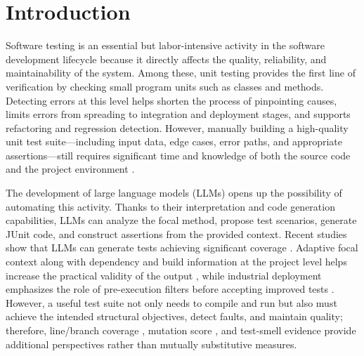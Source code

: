 \documentclass[pdflatex,sn-basic,Numbered,iicol]{sn-jnl}
\begin{document}

\maketitle

\section{Introduction}\label{sec:introduction}

Software testing is an essential but labor-intensive activity in the software development lifecycle because it directly affects the quality, reliability, and maintainability of the system. Among these, unit testing provides the first line of verification by checking small program units such as classes and methods. Detecting errors at this level helps shorten the process of pinpointing causes, limits errors from spreading to integration and deployment stages, and supports refactoring and regression detection. However, manually building a high-quality unit test suite---including input data, edge cases, error paths, and appropriate assertions---still requires significant time and knowledge of both the source code and the project environment \cite{bib26,bib4,bib5}.

The development of large language models (LLMs) opens up the possibility of automating this activity. Thanks to their interpretation and code generation capabilities, LLMs can analyze the focal method, propose test scenarios, generate JUnit code, and construct assertions from the provided context. Recent studies show that LLMs can generate tests achieving significant coverage \cite{bib26,bib4,bib5,bib6}. Adaptive focal context along with dependency and build information at the project level helps increase the practical validity of the output \cite{bib4,bib5,bib29}, while industrial deployment emphasizes the role of pre-execution filters before accepting improved tests \cite{bib32}. However, a useful test suite not only needs to compile and run but also must achieve the intended structural objectives, detect faults, and maintain quality; therefore, line/branch coverage \cite{bib33}, mutation score \cite{bib34}, and test-smell evidence \cite{bib25} provide additional perspectives rather than mutually substitutive measures.
\end{document}
